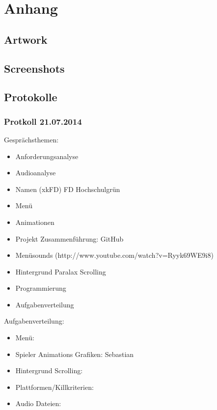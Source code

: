 \documentclass[Skript.tex]{subfiles}
\begin{document}
\newpage
\appendix 
\section{Anhang}

\subsection{Artwork}

\subsection{Screenshots}

\subsection{Protokolle}

\subsubsection*{Protkoll 21.07.2014}

Gesprächsthemen:

\begin{itemize}
\item Anforderungsanalyse
\item Audioanalyse 
\item Namen (xkFD) FD Hochschulgrün
\item Menü
\item Animationen
\item Projekt Zusammenführung: GitHub
\item Menüsounds (http://www.youtube.com/watch?v=Ryyk69WE9i8)
\item Hintergrund Paralax Scrolling
\item Programmierung
\item Aufgabenverteilung
\end{itemize}


Aufgabenverteilung:

\begin{itemize}
\item Menü: 
\item Spieler Animations Grafiken:  Sebastian
\item Hintergrund Scrolling:
\item Plattformen/Killkriterien:
\item Audio Dateien: 
\end{itemize}
\end{document}
